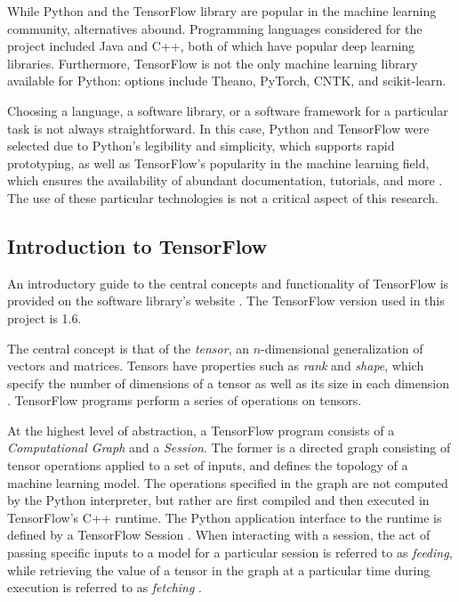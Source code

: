 \documentclass[12pt, titlepage]{report}
\theoremstyle{definition}
\begin{document}
While Python and the TensorFlow library are popular in the machine learning community, alternatives abound. Programming languages considered for the project included Java and C++, both of which have popular deep learning libraries. Furthermore, TensorFlow is not the only machine learning library available for Python: options include Theano, PyTorch, CNTK, and scikit-learn.

Choosing a language, a software library, or a software framework for a particular task is not always straightforward. In this case, Python and TensorFlow were selected due to Python's legibility and simplicity, which supports rapid prototyping, as well as TensorFlow's popularity in the machine learning field, which ensures the availability of abundant documentation, tutorials, and more \cite{bhatia2017why}. The use of these particular technologies is not a critical aspect of this research.

\subsection{Introduction to TensorFlow}
An introductory guide to the central concepts and functionality of TensorFlow is provided on the software library's website \cite{tensorflow2018intro}. The TensorFlow version used in this project is 1.6.

The central concept is that of the \textit{tensor}, an $n$-dimensional generalization of vectors and matrices. Tensors have properties such as \textit{rank} and \textit{shape}, which specify the number of dimensions of a tensor as well as its size in each dimension \cite{tensorflow2018intro}. TensorFlow programs perform a series of operations on tensors.

At the highest level of abstraction, a TensorFlow program consists of a \textit{Computational Graph} and a \textit{Session}. The former is a directed graph consisting of tensor operations applied to a set of inputs, and defines the topology of a machine learning model. The operations specified in the graph are not computed by the Python interpreter, but rather are first compiled and then executed in TensorFlow's C++ runtime. The Python application interface to the runtime is defined by a TensorFlow Session \cite{tensorflow2018graphs}. When interacting with a session, the act of passing specific inputs to a model for a particular session is referred to as \textit{feeding}, while retrieving the value of a tensor in the graph at a particular time during execution is referred to as \textit{fetching} \cite{tensorflow2018intro}.
\end{document}
